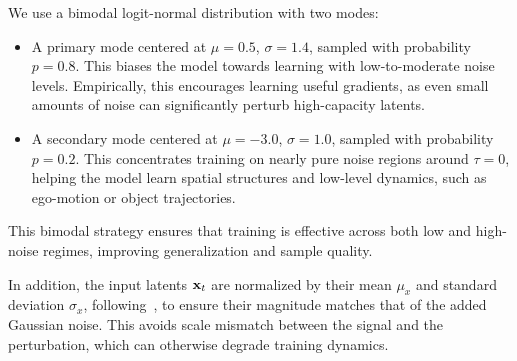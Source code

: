 We use a bimodal logit-normal distribution with two modes:
\begin{itemize}
    \item A primary mode centered at $\mu = 0.5$, $\sigma = 1.4$, sampled with probability $p = 0.8$. This biases the model towards learning with low-to-moderate noise levels. Empirically, this encourages learning useful gradients, as even small amounts of noise can significantly perturb high-capacity latents.
    \item A secondary mode centered at $\mu = -3.0$, $\sigma = 1.0$, sampled with probability $p = 0.2$. This concentrates training on nearly pure noise regions around $\tau = 0$, helping the model learn spatial structures and low-level dynamics, such as ego-motion or object trajectories.
\end{itemize}
This bimodal strategy ensures that training is effective across both low and high-noise regimes, improving generalization and sample quality.

In addition, the input latents ${\mathbf{x}}_t$ are normalized by their mean $\mu_x$ and standard deviation $\sigma_x$, following~\cite{rombach2022highresolution}, to ensure their magnitude matches that of the added Gaussian noise. This avoids scale mismatch between the signal and the perturbation, which can otherwise degrade training dynamics.